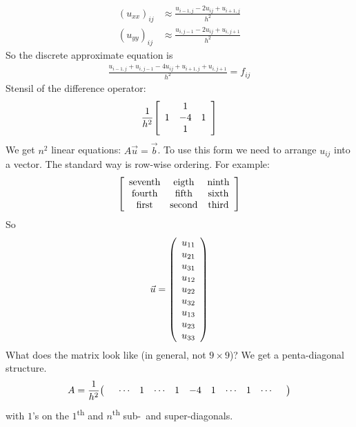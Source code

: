 \documentclass{article}
\begin{document}
        \begin{align}
            (u_{xx})_{ij} &\approx \frac{u_{i-1,j} - 2u_{ij} + u_{i+1,j}}{h^2} \\
            (u_{yy})_{ij} &\approx \frac{u_{i,j-1} - 2u_{ij} + u_{i,j+1}}{h^2}
        \end{align}
        So the discrete approximate equation is
        \begin{align}
            \frac{u_{i-1,j} + u_{i,j-1} - 4u_{ij} + u_{i+1,j} + u_{i,j+1}}{h^2} = f_{ij}
        \end{align}
        Stensil of the difference operator:
        \begin{align}
            \frac{1}{h^2}\qty[\begin{array}{ccc}
                & 1 & \\
                1 & -4 & 1 \\ 
                & 1 &
            \end{array}]
        \end{align}
        We get $n^2$ linear equations: $A\vec{u} = \vec{b}$.  To use this form we need to arrange $u_{ij}$ into a vector.  The standard way is row-wise ordering.  For example:
        \begin{align}
            \qty[\begin{array}{ccc}
                \text{seventh} & \text{eigth} & \text{ninth} \\
                \text{fourth} & \text{fifth} & \text{sixth} \\
                \text{first} & \text{second} & \text{third} \\
            \end{array}]
        \end{align}
        So
        \begin{align}
            \vec{u} = \qty(\begin{array}{c} u_{11} \\ u_{21} \\ u_{31} \\ u_{12} \\ u_{22} \\ u_{32} \\ u_{13} \\ u_{23} \\ u_{33} \end{array})
        \end{align}
        What does the matrix look like (in general, not $9\times 9$)?  We get a penta-diagonal structure.  
        \begin{align}
            A = \frac{1}{h^2}\qty(\begin{array}{ccccccccccc}
            & \cdots & 1 & \cdots & 1 & -4 & 1 & \cdots & 1 & \cdots &
            \end{array})
        \end{align}
        with $1$'s on the $1$\textsuperscript{th} and $n$\textsuperscript{th} sub-~and super-diagonals.
\end{document}
